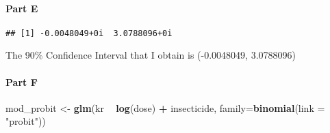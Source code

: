 \documentclass[
]{article}
\newenvironment{Shaded}{\begin{snugshade}}{\end{snugshade}}
\newcommand{\DataTypeTok}[1]{\textcolor[rgb]{0.13,0.29,0.53}{#1}}
\newcommand{\DecValTok}[1]{\textcolor[rgb]{0.00,0.00,0.81}{#1}}
\newcommand{\FloatTok}[1]{\textcolor[rgb]{0.00,0.00,0.81}{#1}}
\newcommand{\KeywordTok}[1]{\textcolor[rgb]{0.13,0.29,0.53}{\textbf{#1}}}
\newcommand{\NormalTok}[1]{#1}
\newcommand{\OperatorTok}[1]{\textcolor[rgb]{0.81,0.36,0.00}{\textbf{#1}}}
\newcommand{\StringTok}[1]{\textcolor[rgb]{0.31,0.60,0.02}{#1}}
\begin{document}
\hypertarget{part-e-1}{%
\paragraph{Part E}\label{part-e-1}}

\begin{Shaded}
\end{Shaded}

\begin{verbatim}
## [1] -0.0048049+0i  3.0788096+0i
\end{verbatim}

The 90\% Confidence Interval that I obtain is (-0.0048049, 3.0788096)

\hypertarget{part-f}{%
\paragraph{Part F}\label{part-f}}

\begin{Shaded}
\begin{Highlighting}[]
\NormalTok{mod_probit <-}\StringTok{ }\KeywordTok{glm}\NormalTok{(kr }\OperatorTok{~}\StringTok{ }\KeywordTok{log}\NormalTok{(dose) }\OperatorTok{+}\StringTok{ }\NormalTok{insecticide, }\DataTypeTok{family=}\KeywordTok{binomial}\NormalTok{(}\DataTypeTok{link =} \StringTok{"probit"}\NormalTok{))}
\end{Highlighting}
\end{Shaded}
\end{document}
